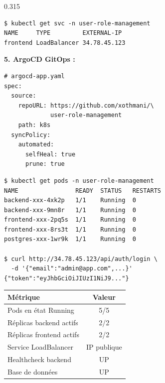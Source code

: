\documentclass[final]{beamer}
\begin{document}
\begin{frame}[t]{}
\begin{columns}[t]
\begin{column}{0.315\linewidth}
\begin{tcolorbox}[sectionbox, title={\faCloud\quad Déploiement sur GCP}]
\begin{tcolorbox}[codebox]
\begin{lstlisting}
$ kubectl get svc -n user-role-management
NAME     TYPE         EXTERNAL-IP
frontend LoadBalancer 34.78.45.123
\end{lstlisting}
\end{tcolorbox}

\vspace{6pt}
\textbf{5. ArgoCD GitOps :}
\begin{tcolorbox}[codebox]
\begin{lstlisting}
# argocd-app.yaml
spec:
  source:
    repoURL: https://github.com/xothmani/\
             user-role-management
    path: k8s
  syncPolicy:
    automated:
      selfHeal: true
      prune: true
\end{lstlisting}
\end{tcolorbox}

\end{tcolorbox}

\begin{tcolorbox}[sectionbox, title={\faCheckCircle\quad Résultats \& Validation}]

\begin{tcolorbox}[codebox]
\begin{lstlisting}
$ kubectl get pods -n user-role-management
NAME                READY  STATUS   RESTARTS
backend-xxx-4xk2p   1/1    Running  0
backend-xxx-9mn8r   1/1    Running  0
frontend-xxx-2pq5s  1/1    Running  0
frontend-xxx-8rs3t  1/1    Running  0
postgres-xxx-1wr9k  1/1    Running  0

$ curl http://34.78.45.123/api/auth/login \
  -d '{"email":"admin@app.com",...}'
{"token":"eyJhbGciOiJIUzI1NiJ9..."}
\end{lstlisting}
\end{tcolorbox}

\vspace{6pt}
\begin{tcolorbox}[resultbox]
\begin{center}
\begin{tabular}{lc}
\textbf{Métrique} & \textbf{Valeur} \\
\midrule
Pods en état Running & 5/5 \\
Réplicas backend actifs & 2/2 \\
Réplicas frontend actifs & 2/2 \\
Service LoadBalancer & IP publique \\
Healthcheck backend & UP \\
Base de données & UP \\
\end{tabular}
\end{center}
\end{tcolorbox}


\end{tcolorbox}
\end{column}
\end{columns}
\end{frame}
\end{document}
